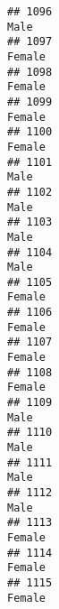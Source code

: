 \documentclass[]{article}
\begin{document}
\begin{verbatim}
## 1096                                                                                                                            Male
## 1097                                                                                                                          Female
## 1098                                                                                                                          Female
## 1099                                                                                                                          Female
## 1100                                                                                                                          Female
## 1101                                                                                                                            Male
## 1102                                                                                                                            Male
## 1103                                                                                                                            Male
## 1104                                                                                                                            Male
## 1105                                                                                                                          Female
## 1106                                                                                                                          Female
## 1107                                                                                                                          Female
## 1108                                                                                                                          Female
## 1109                                                                                                                            Male
## 1110                                                                                                                            Male
## 1111                                                                                                                            Male
## 1112                                                                                                                            Male
## 1113                                                                                                                          Female
## 1114                                                                                                                          Female
## 1115                                                                                                                          Female

\end{verbatim}
\end{document}
